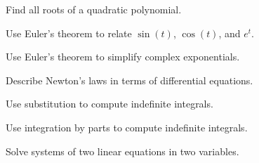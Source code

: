 \begin{readinessAssuranceOutcomes}
\item Find all roots of a quadratic polynomial. 
\item Use Euler's theorem to relate \(\sin(t)\), \(\cos(t)\), and \(e^t\).
\item Use Euler's theorem to simplify complex exponentials.
\item Describe Newton's laws in terms of differential equations.
\item Use substitution to compute indefinite integrals.
\item Use integration by parts to compute indefinite integrals.
\item Solve systems of two linear equations in two variables.
\end{readinessAssuranceOutcomes}
